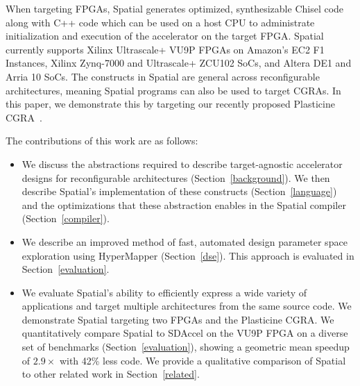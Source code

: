 When targeting FPGAs, Spatial generates optimized, synthesizable Chisel code along with C++ code which can be used on a host CPU to administrate initialization and execution of the accelerator on the target FPGA.
Spatial currently supports Xilinx Ultrascale+ VU9P FPGAs on Amazon's EC2 F1 Instances, Xilinx Zynq-7000 and Ultrascale+ ZCU102 SoCs, and Altera DE1 and Arria 10 SoCs.
The constructs in Spatial are general across reconfigurable architectures, meaning Spatial programs can also be used to target CGRAs. In this paper, we demonstrate this by targeting our recently proposed Plasticine CGRA~\cite{plasticine}.





The contributions of this work are as follows:
\vspace{-5pt}
\begin{itemize}
  \item We discuss the abstractions required to describe target-agnostic accelerator designs for reconfigurable architectures (Section~\ref{background}). We then describe Spatial's implementation of these constructs (Section~\ref{language}) and the optimizations that these abstraction enables in the Spatial compiler (Section~\ref{compiler}).

  \vspace{5pt}

  \item We describe an improved method of fast, automated design parameter space exploration using HyperMapper (Section~\ref{dse}). This approach is evaluated in Section~\ref{evaluation}.

  \vspace{5pt}

  \item We evaluate Spatial's ability to efficiently express a wide variety of applications and
    target multiple architectures from the same source code. We demonstrate Spatial targeting two FPGAs and the Plasticine CGRA.
    We quantitatively compare Spatial to SDAccel on the VU9P FPGA on a diverse set of benchmarks (Section~\ref{evaluation}), showing a geometric mean speedup of $2.9\times$ with 42\% less code.
    We provide a qualitative comparison of Spatial to other related work in Section~\ref{related}.
\end{itemize}


